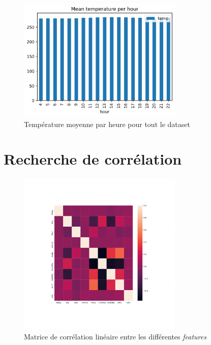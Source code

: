 \begin{appendices}
    \begin{figure}[ht]
        \centering
        \includegraphics[width=0.7\textwidth]{images/mean_temp_per_hour.png}
        \caption{Température moyenne par heure pour tout le dataset}
        \label{appendix:mean_temp_per_hour}
    \end{figure}

    \chapter{Recherche de corrélation}
    \begin{figure}[ht]
        \centering
        \includegraphics[width=0.7\textwidth]{images/corr_mat.png}
        \caption{Matrice de corrélation linéaire entre les différentes \textit{features}}
        \label{appendix:corr_mat}
    \end{figure}


\end{appendices}
